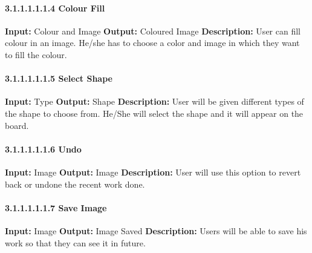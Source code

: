 \documentclass{scrreprt}
\begin{document}
\paragraph{3.1.1.1.1.1.4 Colour Fill}
\hfill \vspace{2.5mm} \break 
\textbf{Input:} Colour and Image \newline
\textbf{Output:} Coloured Image
\vspace{1mm}\newline
\textbf{Description:} \newline 
User can fill colour in an image. He/she has to choose a color and image in which they want to fill the colour.

\paragraph{3.1.1.1.1.1.5 Select Shape}
\hfill \vspace{2.5mm} \break 
\textbf{Input:} Type \newline
\textbf{Output:} Shape
\vspace{1mm}\newline
\textbf{Description:} \newline 
User will be given different types of the shape to choose from. He/She will select the shape and it will appear on the board.

\paragraph{3.1.1.1.1.1.6 Undo}
\hfill \vspace{2.5mm} \break 
\textbf{Input:} Image \newline
\textbf{Output:} Image
\vspace{1mm}\newline
\textbf{Description:} \newline 
User will use this option to revert back or undone the recent work done.

\paragraph{3.1.1.1.1.1.7 Save Image}
\hfill \vspace{2.5mm} \break 
\textbf{Input:} Image \newline
\textbf{Output:} Image Saved
\vspace{1mm}\newline
\textbf{Description:} \newline 
Users will be able to save his work so that they can see it in future.
\end{document}
